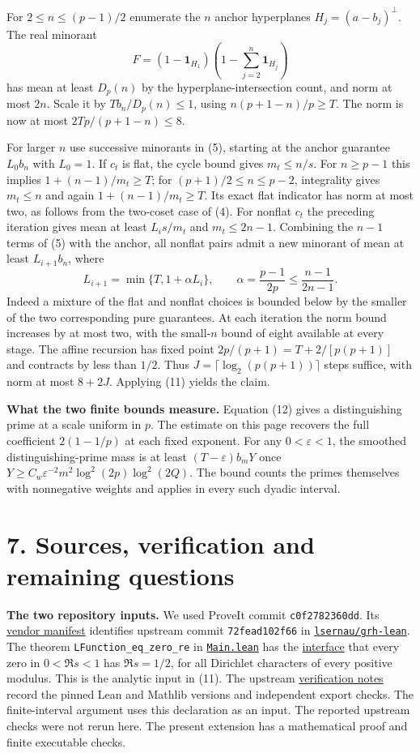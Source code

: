 \documentclass[11pt,letterpaper]{article}
\newcommand{\ind}{\mathbf 1}
\newcommand{\heading}[1]{\section*{\color{ink}#1}}
\newcommand{\subhead}[1]{\par\smallskip\noindent\textbf{#1.}\enspace}
\newcommand{\gh}[2]{\href{https://github.com/VladimirReshetnikov/ProveIt/blob/c0f2782360ddffd79a20c6d828d582e214a2b8c3/Analysis/GeneralizedRiemannHypothesis/#1}{#2}}
\begin{document}
For $2\le n\le(p-1)/2$ enumerate the $n$ anchor hyperplanes $H_j=(a-b_j)^\perp$. The real minorant
\[
 F=(1-\ind_{H_1})\left(1-\sum_{j=2}^n\ind_{H_j}\right)
\]
has mean at least $D_p(n)$ by the hyperplane-intersection count, and norm at most $2n$. Scale it by $T b_n/D_p(n)\le1$, using $n(p+1-n)/p\ge T$. The norm is now at most $2Tp/(p+1-n)\le8$.

For larger $n$ use successive minorants in (5), starting at the anchor guarantee $L_0 b_n$ with $L_0=1$. If $c_t$ is flat, the cycle bound gives $m_t\le n/s$. For $n\ge p-1$ this implies $1+(n-1)/m_t\ge T$; for $(p+1)/2\le n\le p-2$, integrality gives $m_t\le n$ and again $1+(n-1)/m_t\ge T$. Its exact flat indicator has norm at most two, as follows from the two-coset case of (4). For nonflat $c_t$ the preceding iteration gives mean at least $L_i s/m_t$ and $m_t\le2n-1$. Combining the $n-1$ terms of (5) with the anchor, all nonflat pairs admit a new minorant of mean at least $L_{i+1}b_n$, where
\[
 L_{i+1}=\min\{T,1+\alpha L_i\},\qquad
 \alpha=\frac{p-1}{2p}\le\frac{n-1}{2n-1}.
\]
Indeed a mixture of the flat and nonflat choices is bounded below by the smaller of the two corresponding pure guarantees. At each iteration the norm bound increases by at most two, with the small-$n$ bound of eight available at every stage. The affine recursion has fixed point $2p/(p+1)=T+2/[p(p+1)]$ and contracts by less than $1/2$. Thus $J=\lceil\log_2(p(p+1))\rceil$ steps suffice, with norm at most $8+2J$. Applying (11) yields the claim.

\subhead{What the two finite bounds measure}
Equation (12) gives a distinguishing prime at a scale uniform in $p$. The estimate on this page recovers the full coefficient $2(1-1/p)$ at each fixed exponent. For any $0<\varepsilon<1$, the smoothed distinguishing-prime mass is at least $(T-\varepsilon)b_mY$ once $Y\ge C_w\varepsilon^{-2}m^2\log^2(2p)\log^2(2Q)$. The bound counts the primes themselves with nonnegative weights and applies in every such dyadic interval.

\newpage
\heading{7. Sources, verification and remaining questions}
\subhead{The two repository inputs}
We used ProveIt commit \texttt{c0f2782360dd}. Its \gh{vendor/grh-lean/README.md}{vendor manifest} identifies upstream commit \texttt{72fead102f66} in \href{https://github.com/lsernau/grh-lean/tree/72fead102f663d5c7a407964a13dc0cf9d977207}{\texttt{lsernau/grh-lean}}. The theorem \texttt{LFunction\_eq\_zero\_re} in \gh{vendor/grh-lean/grh/src/Main.lean}{\texttt{Main.lean}} has the \gh{vendor/grh-lean/grh/src/Statements.lean}{interface} that every zero in $0<\Re s<1$ has $\Re s=1/2$, for all Dirichlet characters of every positive modulus. This is the analytic input in (11). The upstream \gh{vendor/grh-lean/grh/README.md}{verification notes} record the pinned Lean and Mathlib versions and independent export checks. The finite-interval argument uses this declaration as an input. The reported upstream checks were not rerun here. The present extension has a mathematical proof and finite executable checks.
\end{document}
